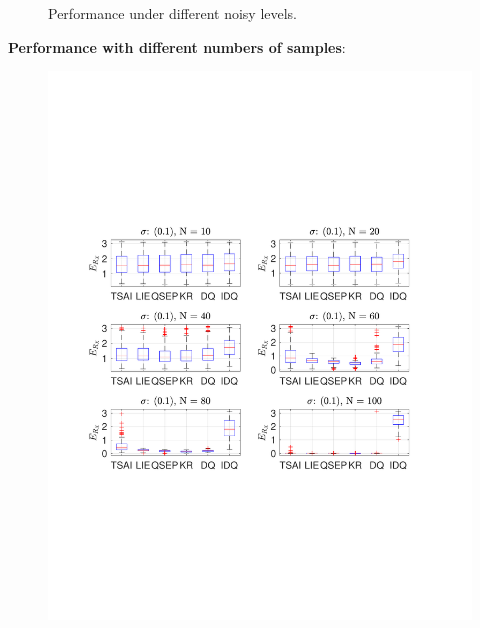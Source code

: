 \begin{figure}
\caption{Performance under different noisy levels.}
\end{figure}

\textbf{Performance with different numbers of samples}:
\begin{figure}
\centering
\includegraphics[scale=0.6]{./hand_eye_figures/conv/conv_r_err_cmp1}

\end{figure}
